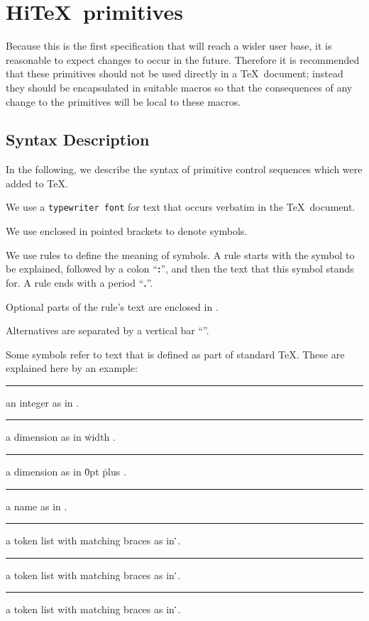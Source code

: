 \section{Hi\TeX\ primitives}

Because this is the first specification that will reach a wider user base,
it is reasonable to expect changes to occur in the future. Therefore it is
recommended that these primitives should not be used directly in a
\TeX\ document; instead they should be encapsulated in suitable
macros so that the consequences of any change to the primitives will 
be local to these macros.

\subsection{Syntax Description}
In the following, we describe the syntax of primitive control sequences which were
added to \TeX.

\itemize
\item We use a {\tt typewriter font}
for text that occurs verbatim in the \TeX\ document.
\item We use  enclosed in pointed brackets to denote symbols.
\item We use rules to define the meaning of symbols.
A rule starts with the symbol
to be explained, followed by a colon ``{\bf :}'', and then the text that this symbol
stands for. A rule ends with a period ``{\bf .}''.
\item Optional parts of the rule's text
are enclosed in .
\item Alternatives are separated by a vertical bar ``\OR''\index{\OR}.
\item Some symbols refer to text that is defined as part of standard \TeX. These are explained here by an example:

\medskip
\rule{}: 
  an integer as in  .
\rule{}:
  a dimension as in  \.{width} .
\rule{}:
  a dimension as in  \.{0pt} \.{plus} .
\rule{}:
  a name as in  .
\rule{}:
  a token list  with matching braces as in
  \.{\LB}\.{\RB}.
\rule{}:
  a token list  with matching braces as in
  \.{\LB}\.{\RB}.
\rule{}:
  a token list with matching braces as in
  \.{\LB}\.{\RB}.
\medskip
\enditemize


